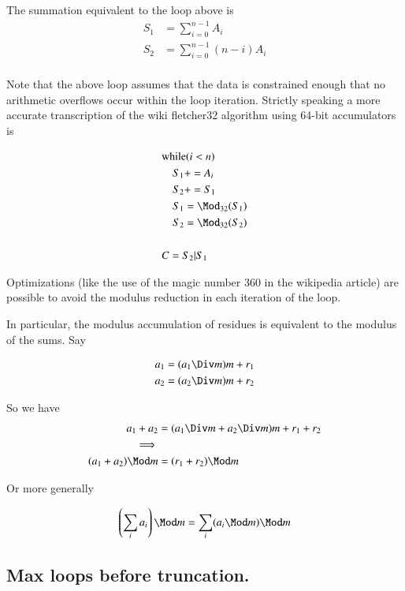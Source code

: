 The summation equivalent to the loop above is
\begin{align*}
S_1 &= \sum_{i=0}^{n-1} A_i \\
S_2 &= \sum_{i=0}^{n-1} (n-i)A_i \\
\end{align*}

Note that the above loop assumes that the data is constrained enough that no arithmetic overflows occur within the loop iteration.
Strictly speaking a more accurate transcription of the wiki fletcher32 algorithm using 64-bit accumulators is

\begin{align*}
&\text{while} ( i < n )  \\
&\quad   S_1 += A_i \\
&\quad   S_2 += S_1 \\
&\quad   S_1 = \Mod_{32}(S_1) \\
&\quad   S_2 = \Mod_{32}(S_2) \\
\\
&C = S_2 | S_1
\end{align*}

Optimizations (like the use of the magic number 360 in the wikipedia article) are possible to avoid the modulus reduction in each iteration of the loop.

In particular, the modulus accumulation of residues is equivalent to the modulus of the sums.  Say

\begin{align*}
a_1 &= (a_1 \Div m ) m + r_1 \\
a_2 &= (a_2 \Div m ) m + r_2
\end{align*}

So we have
\begin{align*}
a_1 + a_2 &= (a_1 \Div m + a_2 \Div m ) m + r_1 + r_2 \\
\implies \\
(a_1 + a_2) \Mod m &= (r_1 + r_2) \Mod m \\
\end{align*}

Or more generally

\begin{align*}
\left(\sum_i a_i \right) \Mod m &= \sum_i (a_i \Mod m) \Mod m \\
\end{align*}

\subsection{Max loops before truncation. }

